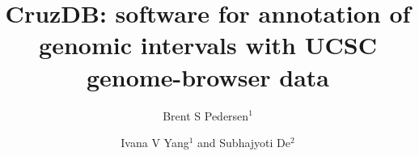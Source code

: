\documentclass[10pt]{bmc_article}
\newenvironment{bmcformat}{\baselineskip20pt\sloppy\setboolean{publ}{false}}{\baselineskip20pt\sloppy}
\begin{document}
\begin{bmcformat}



\title{CruzDB: software for annotation of genomic intervals with UCSC genome-browser data}
 


\author{Brent S Pedersen\correspondingauthor$^1$%
       \and 
         Ivana V Yang$^1$%
         and
         Subhajyoti De\correspondingauthor$^2$%
      }
      


\address{%
    \iid(1)University of Colorado, Anshutz Medical Campus, Department of Medicine %
        12700 East 19th Avenue, 8611 Aurora, CO 80045
    \iid(2)University of Colorado Cancer Center. 13001 E 17th Pl, Aurora, CO 80045
}%

\maketitle




\end{bmcformat}
\end{document}
